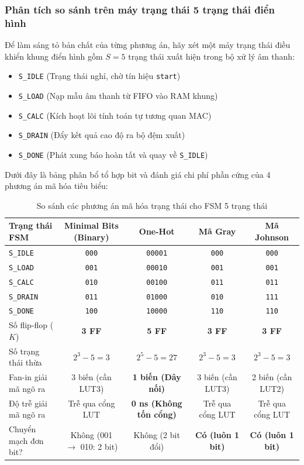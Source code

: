 \subsubsection*{Phân tích so sánh trên máy trạng thái 5 trạng thái điển hình}
Để làm sáng tỏ bản chất của từng phương án, hãy xét một máy trạng thái điều khiển khung điển hình gồm $S = 5$ trạng thái xuất hiện trong bộ xử lý âm thanh:
\begin{itemize}[leftmargin=1.5em, itemsep=1pt]
    \item \texttt{S\_IDLE} (Trạng thái nghỉ, chờ tín hiệu \texttt{start})
    \item \texttt{S\_LOAD} (Nạp mẫu âm thanh từ FIFO vào RAM khung)
    \item \texttt{S\_CALC} (Kích hoạt lõi tính toán tự tương quan MAC)
    \item \texttt{S\_DRAIN} (Đẩy kết quả cao độ ra bộ đệm xuất)
    \item \texttt{S\_DONE} (Phát xung báo hoàn tất và quay về \texttt{S\_IDLE})
\end{itemize}

Dưới đây là bảng phân bổ tổ hợp bit và đánh giá chi phí phần cứng của 4 phương án mã hóa tiêu biểu:

\begin{table}[htbp]
\centering
\footnotesize
\setlength{\tabcolsep}{4.5pt}
\caption{So sánh các phương án mã hóa trạng thái cho FSM 5 trạng thái}
\label{tab:ch02_fsm_encodings}
\begin{tabular}{lcccc}
\toprule
Trạng thái FSM & Minimal Bits (Binary) & One-Hot & Mã Gray & Mã Johnson \\
\midrule
\texttt{S\_IDLE}  & \texttt{000} & \texttt{00001} & \texttt{000} & \texttt{000} \\
\texttt{S\_LOAD}  & \texttt{001} & \texttt{00010} & \texttt{001} & \texttt{001} \\
\texttt{S\_CALC}  & \texttt{010} & \texttt{00100} & \texttt{011} & \texttt{011} \\
\texttt{S\_DRAIN} & \texttt{011} & \texttt{01000} & \texttt{010} & \texttt{111} \\
\texttt{S\_DONE}  & \texttt{100} & \texttt{10000} & \texttt{110} & \texttt{110} \\
\midrule
Số flip-flop ($K$) & \textbf{3 FF} & \textbf{5 FF} & \textbf{3 FF} & \textbf{3 FF} \\
Số trạng thái thừa & $2^3 - 5 = 3$ & $2^5 - 5 = 27$ & $2^3 - 5 = 3$ & $2^3 - 5 = 3$ \\
Fan-in giải mã ngõ ra & 3 biến (cần LUT3) & \textbf{1 biến (Dây nối)} & 3 biến (cần LUT3) & 2 biến (cần LUT2) \\
Độ trễ giải mã ngõ ra & Trễ qua cổng LUT & \textbf{0 ns (Không tốn cổng)} & Trễ qua cổng LUT & Trễ qua cổng LUT \\
Chuyển mạch đơn bit? & Không (001 $\to$ 010: 2 bit) & Không (2 bit đổi) & \textbf{Có (luôn 1 bit)} & \textbf{Có (luôn 1 bit)} \\
\bottomrule
\end{tabular}
\end{table}

